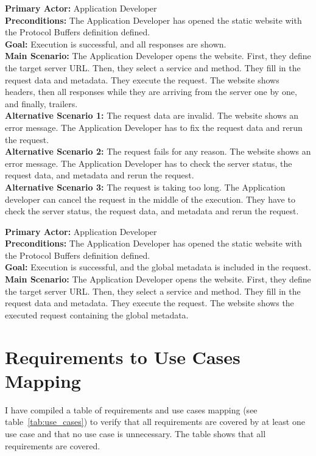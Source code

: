 \textbf{Primary Actor:} Application Developer\\
\textbf{Preconditions:} The Application Developer has opened the static website with the Protocol Buffers definition defined.\\
\textbf{Goal:} Execution is successful, and all responses are shown.\\
\textbf{Main Scenario:}
The Application Developer opens the website.
First, they define the target server URL\@.
Then, they select a service and method.
They fill in the request data and metadata.
They execute the request.
The website shows headers, then all responses while they are arriving from the server one by one, and finally, trailers.\\
\textbf{Alternative Scenario 1:}
The request data are invalid.
The website shows an error message.
The Application Developer has to fix the request data and rerun the request.\\
\textbf{Alternative Scenario 2:}
The request fails for any reason.
The website shows an error message.
The Application Developer has to check the server status, the request data, and metadata and rerun the request.\\
\textbf{Alternative Scenario 3:}
The request is taking too long.
The Application developer can cancel the request in the middle of the execution.
They have to check the server status, the request data, and metadata and rerun the request.


\textbf{Primary Actor:} Application Developer\\
\textbf{Preconditions:} The Application Developer has opened the static website with the Protocol Buffers definition defined.\\
\textbf{Goal:} Execution is successful, and the global metadata is included in the request.\\
\textbf{Main Scenario:}
The Application Developer opens the website.
First, they define the target server URL\@.
Then, they select a service and method.
They fill in the request data and metadata.
They execute the request.
The website shows the executed request containing the global metadata.


\section{Requirements to Use Cases Mapping}
I have compiled a table of requirements and use cases mapping (see table~\ref{tab:use_cases}) to verify that all requirements are covered by at least one use case and that no use case is unnecessary.
The table shows that all requirements are covered.

